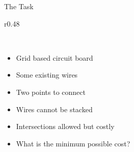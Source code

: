 \documentclass[aspectratio=169,xcolor=dvipsnames, t]{beamer}
\def\circbwirelinewidth{1mm}
\begin{document}
\begin{frame}{The Task}
\begin{wrapfigure}{r}{0.48\textwidth}
    \end{wrapfigure}
    \ %
    \begin{itemize}
        \item Grid based circuit board
        \item Some existing wires
        \item Two points to connect
        \item Wires cannot be stacked
        \item Intersections allowed but costly
        \item What is the minimum possible cost?
    \end{itemize}
\end{frame}
\end{document}
